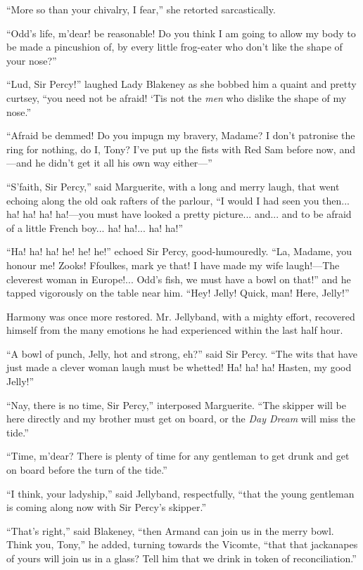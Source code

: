 \documentclass[paper=5.5in:8.5in,BCOR=7mm,twoside,DIV=calc,12pt,usegeometry,chapterprefix,endperiod,headings=big]{scrbook}
\begin{document}
\enquote{More so than your chivalry, I fear,} she retorted sarcastically.

\enquote{Odd's life, m'dear! be reasonable! Do you think I am going to allow my body to be made a pincushion of, by every little frog-eater who don't like the shape of your nose?}

\enquote{Lud, Sir Percy!} laughed Lady Blakeney as she bobbed him a quaint and pretty curtsey, \enquote{you need not be afraid! `Tis not the \textit{men} who dislike the shape of my nose.}

\enquote{Afraid be demmed! Do you impugn my bravery, Madame? I don't patronise the ring for nothing, do I, Tony? I've put up the fists with Red Sam before now, and---and he didn't get it all his own way either---}

\enquote{S'faith, Sir Percy,} said Marguerite, with a long and merry laugh, that went echoing along the old oak rafters of the parlour, \enquote{I would I had seen you then... ha! ha! ha! ha!---you must have looked a pretty picture... and... and to be afraid of a little French boy... ha! ha!... ha! ha!}

\enquote{Ha! ha! ha! he! he! he!} echoed Sir Percy, good-humouredly. \enquote{La, Madame, you honour me! Zooks! \newline Ffoulkes, mark ye that! I have made my wife laugh!---The cleverest woman in Europe!... Odd's fish, we must have a bowl on that!} and he tapped vigorously on the table near him. \enquote{Hey! Jelly! Quick, man! Here, Jelly!}

Harmony was once more restored. Mr. Jellyband, with a mighty effort, recovered himself from the many emotions he had experienced within the last half hour.

\enquote{A bowl of punch, Jelly, hot and strong, eh?} said Sir Percy. \enquote{The wits that have just made a clever woman laugh must be whetted! Ha! ha! ha! Hasten, my good Jelly!}

\enquote{Nay, there is no time, Sir Percy,} interposed Marguerite. \enquote{The skipper will be here directly and my brother must get on board, or the \textit{Day Dream} will miss the tide.}

\enquote{Time, m'dear? There is plenty of time for any gentleman to get drunk and get on board before the turn of the tide.}

\enquote{I think, your ladyship,} said Jellyband, respectfully, \enquote{that the young gentleman is coming along now with Sir Percy's skipper.}

\enquote{That's right,} said Blakeney, \enquote{then Armand can join us in the merry bowl. Think you, Tony,} he added, turning towards the Vicomte, \enquote{that that jackanapes of yours will join us in a glass? Tell him that we drink in token of reconciliation.}
\end{document}
